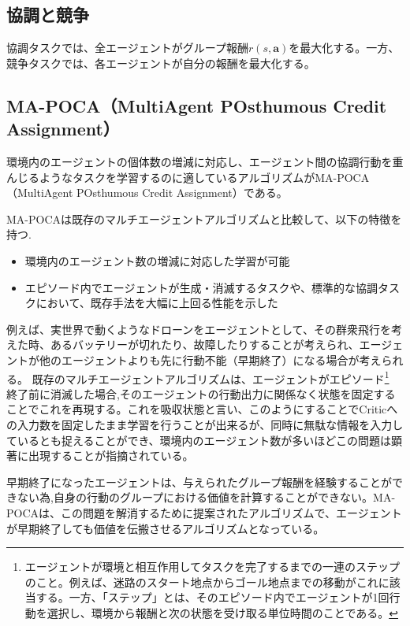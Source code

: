 \subsection*{協調と競争}
協調タスクでは、全エージェントがグループ報酬$r(s, \boldsymbol{a})$を最大化する。一方、競争タスクでは、各エージェントが自分の報酬を最大化する。

\subsection{MA-POCA（MultiAgent POsthumous Credit Assignment）}
  環境内のエージェントの個体数の増減に対応し、エージェント間の協調行動を重んじるようなタスクを学習するのに適しているアルゴリズムがMA-POCA（MultiAgent POsthumous Credit Assignment）\cite{mapoca}である。\par 
  MA-POCAは既存のマルチエージェントアルゴリズムと比較して、以下の特徴を持つ.
  \begin{itemize}
    \item 環境内のエージェント数の増減に対応した学習が可能
    \item エピソード内でエージェントが生成・消滅するタスクや、標準的な協調タスクにおいて、既存手法を大幅に上回る性能を示した
  \end{itemize}
  例えば、実世界で動くようなドローンをエージェントとして、その群衆飛行を考えた時、あるバッテリーが切れたり、故障したりすることが考えられ、エージェントが他のエージェントよりも先に行動不能（早期終了）になる場合が考えられる。
  既存のマルチエージェントアルゴリズムは、エージェントがエピソード\footnote{エージェントが環境と相互作用してタスクを完了するまでの一連のステップのこと。例えば、迷路のスタート地点からゴール地点までの移動がこれに該当する。一方、「ステップ」とは、そのエピソード内でエージェントが1回行動を選択し、環境から報酬と次の状態を受け取る単位時間のことである。}
  終了前に消滅した場合,そのエージェントの行動出力に関係なく状態を固定することでこれを再現する。これを吸収状態と言い、このようにすることでCriticへの入力数を固定したまま学習を行うことが出来るが、同時に無駄な情報を入力しているとも捉えることができ、環境内のエージェント数が多いほどこの問題は顕著に出現することが指摘されている。\par
  早期終了になったエージェントは、与えられたグループ報酬を経験することができない為,自身の行動のグループにおける価値を計算することができない。MA-POCAは、この問題を解消するために提案されたアルゴリズムで、エージェントが早期終了しても価値を伝搬させるアルゴリズムとなっている。\par
